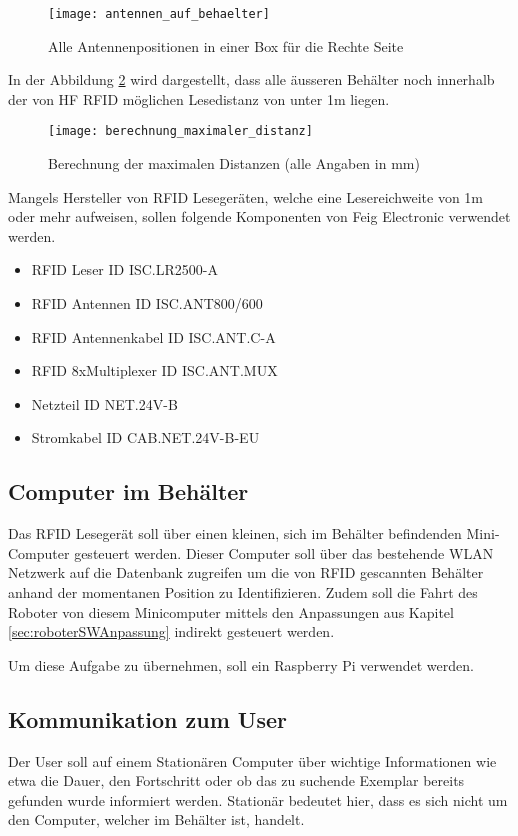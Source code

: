 \begin{figure}
	\centering
	\texttt{[image: antennen\_auf\_behaelter]}
	\caption{Alle Antennenpositionen in einer Box für die Rechte Seite}
	\label{fig:antennenPositionen}
\end{figure}

In der Abbildung \ref{fig:distanzcalc} wird dargestellt, dass alle äusseren Behälter noch innerhalb der von HF RFID möglichen Lesedistanz von unter 1m liegen.

\begin{figure}
	\centering
	\texttt{[image: berechnung\_maximaler\_distanz]}
	\caption{Berechnung der maximalen Distanzen (alle Angaben in mm)}
	\label{fig:distanzcalc}
\end{figure}

Mangels Hersteller von RFID Lesegeräten, welche eine Lesereichweite von 1m oder mehr aufweisen, sollen folgende Komponenten von Feig Electronic verwendet werden. 
\begin{itemize}
	\item RFID Leser ID ISC.LR2500-A
	\item RFID Antennen ID ISC.ANT800/600
	\item RFID Antennenkabel ID ISC.ANT.C-A
	\item RFID 8xMultiplexer ID ISC.ANT.MUX
	\item Netzteil ID NET.24V-B
	\item Stromkabel ID CAB.NET.24V-B-EU
\end{itemize}

\clearpage
\subsection{Computer im Behälter}
Das RFID Lesegerät soll über einen kleinen, sich im Behälter befindenden Mini-Computer gesteuert werden. Dieser Computer soll über das bestehende WLAN Netzwerk auf die Datenbank zugreifen um die von RFID gescannten Behälter anhand der momentanen Position zu Identifizieren.  
Zudem soll die Fahrt des Roboter von diesem Minicomputer mittels den Anpassungen aus Kapitel  \ref{sec:roboterSWAnpassung} indirekt gesteuert werden.

Um diese Aufgabe zu übernehmen, soll ein Raspberry Pi verwendet werden.

\subsection{Kommunikation zum User}
Der User soll auf einem Stationären Computer über wichtige Informationen wie etwa die Dauer, den Fortschritt oder ob das zu suchende Exemplar bereits gefunden wurde informiert werden. Stationär bedeutet hier, dass es sich nicht um den Computer, welcher im Behälter ist, handelt.

